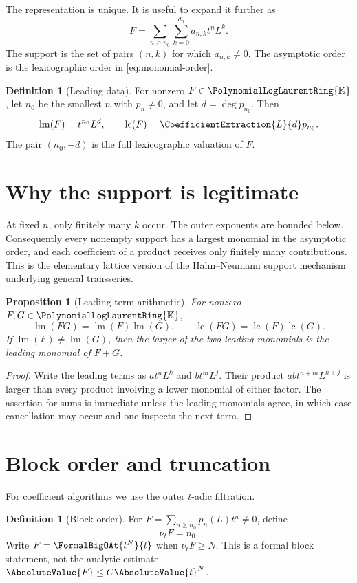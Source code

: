 \documentclass[11pt,oneside]{book}
\newtheorem{proposition}[theorem]{Proposition}
\theoremstyle{definition}
\newtheorem{definition}[theorem]{Definition}
\theoremstyle{remark}
\DeclareMathOperator{\lm}{lm}
\DeclareMathOperator{\lc}{lc}
\newcommand{\K}{\mathbb K}
\newcommand{\PLpoly}{\PolynomialLogLaurentRing{\K}}
\begin{document}
The representation is unique.  It is useful to expand it further as
\[
 F=\sum_{n\ge n_0}\sum_{k=0}^{d_n}a_{n,k}t^nL^k.
\]
The support is the set of pairs $(n,k)$ for which $a_{n,k}\ne0$.
The asymptotic order is the lexicographic order in \eqref{eq:monomial-order}.

\begin{definition}[Leading data]
For nonzero $F\in\PLpoly$, let $n_0$ be the smallest $n$ with
$p_n\ne0$, and let $d=\deg p_{n_0}$.  Then
\[
 \lm(F)=t^{n_0}L^d,
 \qquad
 \lc(F)=\CoefficientExtraction{L}{d}p_{n_0}.
\]
The pair $(n_0,-d)$ is the full lexicographic valuation of $F$.
\end{definition}

\section{Why the support is legitimate}
At fixed $n$, only finitely many $k$ occur.  The outer exponents are bounded
below.  Consequently every nonempty support has a largest monomial in the
asymptotic order, and each coefficient of a product receives only finitely
many contributions.  This is the elementary lattice version of the
Hahn--Neumann support mechanism underlying general transseries.

\begin{proposition}[Leading-term arithmetic]\label{prop:leading-arithmetic}
For nonzero $F,G\in\PLpoly$,
\[
 \lm(FG)=\lm(F)\lm(G),
 \qquad
 \lc(FG)=\lc(F)\lc(G).
\]
If $\lm(F)\ne\lm(G)$, then the larger of the two leading monomials is the
leading monomial of $F+G$.
\end{proposition}
\begin{proof}
Write the leading terms as $a t^nL^k$ and $b t^mL^j$.  Their product
$ab t^{n+m}L^{k+j}$ is larger than every product involving a lower monomial
of either factor.  The assertion for sums is immediate unless the leading
monomials agree, in which case cancellation may occur and one inspects the
next term.
\end{proof}

\section{Block order and truncation}
For coefficient algorithms we use the outer $t$-adic filtration.

\begin{definition}[Block order]
For $F=\sum_{n\ge n_0}p_n(L)t^n\ne0$, define
\[
 \nu_tF=n_0.
\]
Write $F=\FormalBigOAt{t^N}{t}$ when $\nu_tF\ge N$.  This is a formal block statement,
not the analytic estimate
$\AbsoluteValue{F}\le C\AbsoluteValue{t}^N$.
\end{definition}
\end{document}
